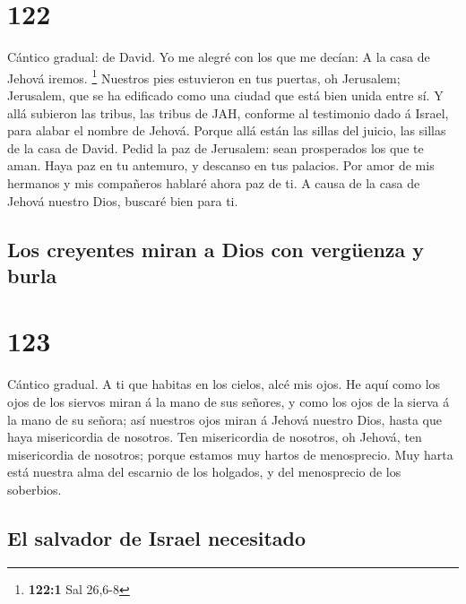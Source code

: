 \hypertarget{section-121}{%
\section{122}\label{section-121}}

 Cántico gradual: de David. Yo me alegré con los que me
decían: A la casa de Jehová iremos. \footnote{\textbf{122:1} Sal 26,6-8}
 Nuestros pies estuvieron en tus puertas, oh Jerusalem;
 Jerusalem, que se ha edificado como una ciudad que está
bien unida entre sí.  Y allá subieron las tribus, las tribus
de JAH, conforme al testimonio dado á Israel, para alabar el nombre de
Jehová.  Porque allá están las sillas del juicio, las sillas
de la casa de David.  Pedid la paz de Jerusalem: sean
prosperados los que te aman.  Haya paz en tu antemuro, y
descanso en tus palacios.  Por amor de mis hermanos y mis
compañeros hablaré ahora paz de ti.  A causa de la casa de
Jehová nuestro Dios, buscaré bien para ti.

\hypertarget{los-creyentes-miran-a-dios-con-verguxfcenza-y-burla}{%
\subsection{Los creyentes miran a Dios con vergüenza y
burla}\label{los-creyentes-miran-a-dios-con-verguxfcenza-y-burla}}

\hypertarget{section-122}{%
\section{123}\label{section-122}}

 Cántico gradual. A ti que habitas en los cielos, alcé mis
ojos.  He aquí como los ojos de los siervos miran á la mano
de sus señores, y como los ojos de la sierva á la mano de su señora; así
nuestros ojos miran á Jehová nuestro Dios, hasta que haya misericordia
de nosotros.  Ten misericordia de nosotros, oh Jehová, ten
misericordia de nosotros; porque estamos muy hartos de menosprecio.
 Muy harta está nuestra alma del escarnio de los holgados, y
del menosprecio de los soberbios.

\hypertarget{el-salvador-de-israel-necesitado}{%
\subsection{El salvador de Israel
necesitado}\label{el-salvador-de-israel-necesitado}}

